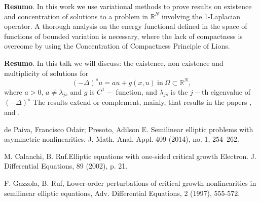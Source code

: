 	\vspace{24pt}
	
	
	
	\noindent\textbf{Resumo}.\label{mtop} 
	In this work we use variational methods to prove results on existence and  concentration of solutions to a problem in $\mathbb{R}^N$ involving the 1-Laplacian operator. A thorough analysis on the energy functional defined in the space of functions of bounded variation is necessary, where the lack of compactness is overcome by using the Concentration of Compactness Principle of Lions. 
	
	\vspace{24pt}

	
	
	\noindent\textbf{Resumo}.\label{ohm} 
	In this talk we will discuss: the existence, non existence and multiplicity of solutions for
	$$(-\Delta)^s u= a u + g(x,u) \ \mbox{in} \ \Omega \subset \mathbb{R}^N,$$
	where $ a>0$, $ a \neq \lambda_{js}$ and $ g$ is $C^1-$ function, and
	$\lambda_{js}$ is the $j-$th eigenvalue of $(-\Delta)^s$
	The results extend or complement, mainly, that results in the papers \cite{ref5}, \cite{ref6} and \cite{ref7}.
	
	
	\begin{thebibliography}{999}
		 de Paiva, Francisco Odair; Presoto, Adilson E. Semilinear elliptic problems with asymmetric nonlinearities. J. Math. Anal. Appl. 409 (2014), no. 1, 254–262.
		
		M. Calanchi, B. Ruf.Elliptic equations with one-sided critical growth Electron. J. Differential Equations, 89 (2002), p. 21.
		
		F. Gazzola, B. Ruf, Lower-order perturbations of critical growth nonlinearities in semilinear elliptic equations, Adv. Differential Equations, 2 (1997), 555-572.
	\end{thebibliography}
	
